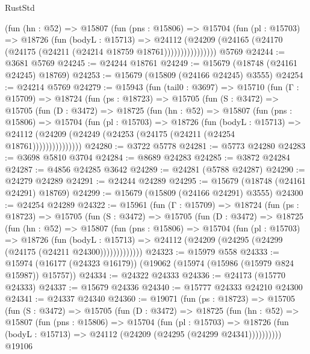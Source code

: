 \begin{lexlean}{RustStd}
\begin{coremodule}
                (fun (hn : @52) =>
                @15807
                  (fun (pns : @15806) =>
                  @15704
                    (fun (pl : @15703) =>
                    @18726
                      (fun (bodyL : @15713) =>
                      @24112
                        (@24209
                          (@24165 (@24170 (@24175 (@24211 (@24214 @18759 @18761))))))))))))))))
    @5769
@24244 := @3681 @5769
@24245 := @24244 @18761
@24249 := @15679 (@18748 (@24161 @24245) @18769)
@24253 := @15679 (@15809 (@24166 @24245) @3555)
@24254 := @24214 @5769
@24279 := @15943
    (fun (tail0 : @3697) =>
    @15710
      (fun (Γ : @15709) =>
      @18724
        (fun (ps : @18723) =>
        @15705
          (fun (S : @3472) =>
          @15705
            (fun (D : @3472) =>
            @18725
              (fun (hn : @52) =>
              @15807
                (fun (pns : @15806) =>
                @15704
                  (fun (pl : @15703) =>
                  @18726
                    (fun (bodyL : @15713) =>
                    @24112 (@24209 (@24249 (@24253 (@24175 (@24211 (@24254 @18761)))))))))))))))
@24280 := @3722 @5778
@24281 := @5773 @24280
@24283 := @3698 @5810 @3704
@24284 := @8689 @24283
@24285 := @3872 @24284
@24287 := @4856 @24285 @3642
@24289 := @24281 (@5788 @24287)
@24290 := @24279 @24289
@24291 := @24244 @24289
@24295 := @15679 (@18748 (@24161 @24291) @18769)
@24299 := @15679 (@15809 (@24166 @24291) @3555)
@24300 := @24254 @24289
@24322 := @15961
    (fun (Γ : @15709) =>
    @18724
      (fun (ps : @18723) =>
      @15705
        (fun (S : @3472) =>
        @15705
          (fun (D : @3472) =>
          @18725
            (fun (hn : @52) =>
            @15807
              (fun (pns : @15806) =>
              @15704
                (fun (pl : @15703) =>
                @18726
                  (fun (bodyL : @15713) =>
                  @24112 (@24209 (@24295 (@24299 (@24175 (@24211 @24300)))))))))))))
@24323 := @15979 @558
@24333 := @15974 (@16177 (@24323 @16179)) (@19062 (@15974 (@15986 (@15979 @824 @15987)) @15757))
@24334 := @24322 @24333
@24336 := @24173 (@15770 @24333)
@24337 := @15679 @24336
@24340 := @15777 @24333 @24210 @24300
@24341 := @24337 @24340
@24360 := @19071
    (fun (ps : @18723) =>
    @15705
      (fun (S : @3472) =>
      @15705
        (fun (D : @3472) =>
        @18725
          (fun (hn : @52) =>
          @15807
            (fun (pns : @15806) =>
            @15704
              (fun (pl : @15703) =>
              @18726 (fun (bodyL : @15713) => @24112 (@24209 (@24295 (@24299 @24341))))))))))
    @19106

\end{coremodule}
\end{lexlean}
